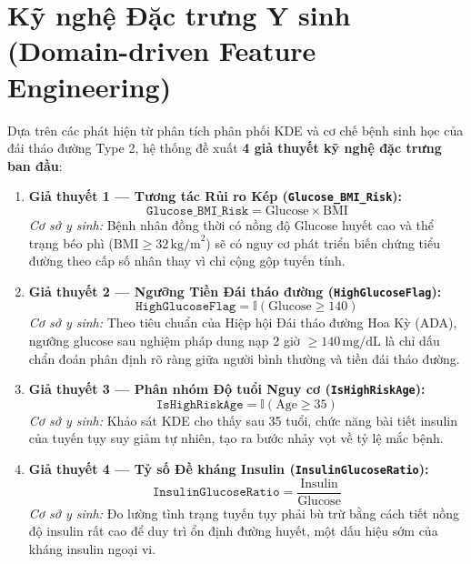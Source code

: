 \documentclass[12pt,a4paper]{report}
\begin{document}
\section{Kỹ nghệ Đặc trưng Y sinh (Domain-driven Feature Engineering)}

Dựa trên các phát hiện từ phân tích phân phối KDE và cơ chế bệnh sinh học của đái tháo đường Type 2, hệ thống đề xuất \textbf{4 giả thuyết kỹ nghệ đặc trưng ban đầu}:

\begin{enumerate}[leftmargin=1.5em]
    \item \textbf{Giả thuyết 1 — Tương tác Rủi ro Kép (\texttt{Glucose\_BMI\_Risk}):}
    \begin{equation}
    \texttt{Glucose\_BMI\_Risk} = \text{Glucose} \times \text{BMI}
    \end{equation}
    \textit{Cơ sở y sinh:} Bệnh nhân đồng thời có nồng độ Glucose huyết cao và thể trạng béo phì ($\text{BMI} \ge 32\,\text{kg/m}^2$) sẽ có nguy cơ phát triển biến chứng tiểu đường theo cấp số nhân thay vì chỉ cộng gộp tuyến tính.
    
    \item \textbf{Giả thuyết 2 — Ngưỡng Tiền Đái tháo đường (\texttt{HighGlucoseFlag}):}
    \begin{equation}
    \texttt{HighGlucoseFlag} = \mathbb{I}(\text{Glucose} \ge 140)
    \end{equation}
    \textit{Cơ sở y sinh:} Theo tiêu chuẩn của Hiệp hội Đái tháo đường Hoa Kỳ (ADA), ngưỡng glucose sau nghiệm pháp dung nạp 2 giờ $\ge 140\,\text{mg/dL}$ là chỉ dấu chẩn đoán phân định rõ ràng giữa người bình thường và tiền đái tháo đường.
    
    \item \textbf{Giả thuyết 3 — Phân nhóm Độ tuổi Nguy cơ (\texttt{IsHighRiskAge}):}
    \begin{equation}
    \texttt{IsHighRiskAge} = \mathbb{I}(\text{Age} \ge 35)
    \end{equation}
    \textit{Cơ sở y sinh:} Khảo sát KDE cho thấy sau 35 tuổi, chức năng bài tiết insulin của tuyến tụy suy giảm tự nhiên, tạo ra bước nhảy vọt về tỷ lệ mắc bệnh.
    
    \item \textbf{Giả thuyết 4 — Tỷ số Đề kháng Insulin (\texttt{InsulinGlucoseRatio}):}
    \begin{equation}
    \texttt{InsulinGlucoseRatio} = \frac{\text{Insulin}}{\text{Glucose}}
    \end{equation}
    \textit{Cơ sở y sinh:} Đo lường tình trạng tuyến tụy phải bù trừ bằng cách tiết nồng độ insulin rất cao để duy trì ổn định đường huyết, một dấu hiệu sớm của kháng insulin ngoại vi.
\end{enumerate}
\end{document}
